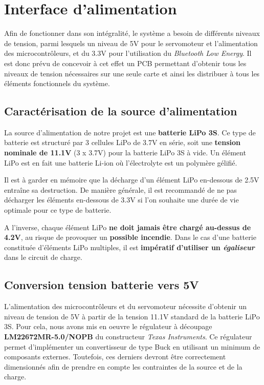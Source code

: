 \documentclass[a4paper,12pt]{book}
\begin{document}
	
	

	\chapter{Interface d'alimentation}
		
	Afin de fonctionner dans son intégralité, le système a besoin de différents niveaux de tension, parmi lesquels un niveau de 5V pour le servomoteur et l'alimentation des microcontrôleurs, et du 3.3V pour l'utilisation du \textit{Bluetooth Low Energy}. Il est donc prévu de concevoir à cet effet un PCB permettant d'obtenir tous les niveaux de tension nécessaires sur une seule carte et ainsi les distribuer à tous les éléments fonctionnels du système.
		
		\section{Caractérisation de la source d'alimentation}
			
		La source d'alimentation de notre projet est une \textbf{batterie LiPo 3S}. Ce type de batterie est structuré par 3 cellules LiPo de 3.7V en série, soit une \textbf{tension nominale de 11.1V} (3 x 3.7V) pour la batterie LiPo 3S à vide. Un élément LiPo est en fait une batterie Li-ion où l'électrolyte est un polymère gélifié.
			
		Il est à garder en mémoire que la décharge d'un élément LiPo en-dessous de 2.5V entraîne sa destruction. De manière générale, il est recommandé de ne pas décharger les éléments en-dessous de 3.3V si l'on souhaite une durée de vie optimale pour ce type de batterie. 
			
		A l'inverse, chaque élément LiPo \textbf{ne doit jamais être chargé au-dessus de 4.2V}, au risque de provoquer un \textbf{possible incendie}. Dans le cas d'une batterie constituée d'éléments LiPo multiples, il est \textbf{impératif d'utiliser un \textit{égaliseur}} dans le circuit de charge.
		
			
		\section{Conversion tension batterie vers 5V}
			
			L'alimentation des microcontrôleurs et du servomoteur nécessite d'obtenir un niveau de tension de 5V à partir de la tension 11.1V standard de la batterie LiPo 3S. Pour cela, nous avons mis en oeuvre le régulateur à découpage \textbf{LM22672MR-5.0/NOPB} du constructeur \textit{Texas Instruments}. Ce régulateur permet d'implémenter un convertisseur de type Buck en utilisant un minimum de composants externes. Toutefois, ces derniers devront être correctement dimensionnés afin de prendre en compte les contraintes de la source et de la charge.
			
\end{document}
